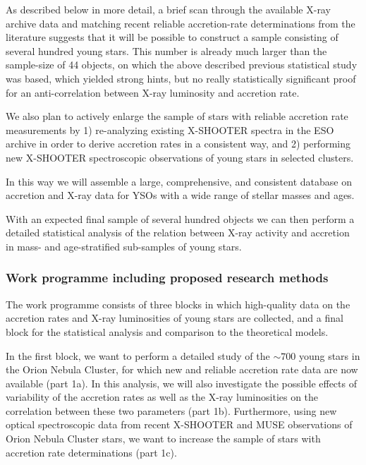 \documentclass[10pt,fleqn,twoside,a4paper]{article}
\begin{document}
\medskip


As described below in more detail, a brief scan through
the available X-ray archive data and matching recent
reliable accretion-rate determinations from the literature
suggests that
it will be possible to construct a sample consisting of several
hundred
young stars.
This number is already much larger than the sample-size of 44
objects, on which the above described previous statistical 
study was based, which yielded strong hints, but no really 
statistically significant proof for an 
anti-correlation between X-ray luminosity and accretion rate.


We also plan to actively enlarge the sample of stars with 
reliable accretion rate measurements by 
%
1) re-analyzing existing X-SHOOTER spectra in the ESO archive
in order to derive accretion rates in a consistent way, and
%
2) performing new X-SHOOTER spectroscopic 
observations of young stars in selected clusters.

\begin{highlight}
In this way we will assemble a large, comprehensive, and consistent
database on accretion and X-ray data for YSOs with a wide range of
stellar masses and ages.
\end{highlight}
%
With an expected final sample of several hundred objects we can then perform a
 detailed statistical analysis
of the relation between X-ray activity and accretion in mass- and 
age-stratified sub-samples of young stars. 

\subsubsection{Work programme including proposed research methods}

The work programme consists of three blocks in which high-quality data
on the accretion rates and X-ray luminosities of young stars are collected,
and a final block for the statistical analysis and
comparison to the theoretical models.

In the first block, we want to perform a detailed study
of the $\sim 700$ young stars in the Orion Nebula Cluster, for which
 new and reliable  accretion rate data are now available (part 1a).
%
In this analysis, we will also investigate the possible effects of variability
of the accretion rates as well as the X-ray luminosities
on the correlation between these two parameters (part 1b).
%
Furthermore, using new optical spectroscopic data from recent X-SHOOTER 
and MUSE observations of Orion Nebula Cluster stars,
we want to increase the sample of stars with accretion rate
determinations (part 1c).
\medskip
\end{document}
